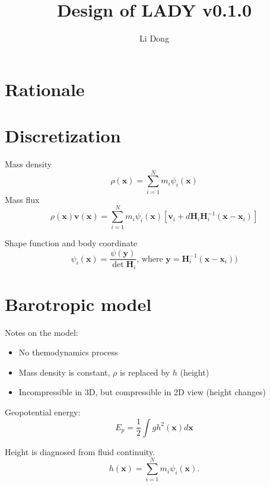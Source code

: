 \documentclass[slidestop,compress,mathserif]{beamer}
\title{Design of LADY v0.1.0}
\author{Li Dong}
\begin{document}
\begin{frame}
  \titlepage
\end{frame}

\section{Rationale}
\label{sec:Rationale}

\begin{frame}

\end{frame}

\section{Discretization}
\label{sec:Discretization}

\begin{frame}
  Mass density
  \begin{equation}
    \rho(\mathbf{x}) = \sum_{i = 1}^{N} m_i \psi_i(\mathbf{x})
  \end{equation}
  Mass flux
  \begin{equation}
    \rho(\mathbf{x}) \mathbf{v}(\mathbf{x}) = \sum_{i = 1}^{N} m_i \psi_i(\mathbf{x}) \left[ \mathbf{v}_i + d\mathbf{H}_i \mathbf{H}_i^{-1}(\mathbf{x} - \mathbf{x}_i) \right]
  \end{equation}
  \begin{exampleblock}{Shape function and body coordinate}
    \begin{equation*}
      \psi_i(\mathbf{x}) = \frac{\psi(\mathbf{y})}{\det{\mathbf{H}}_i}\text{, where }\mathbf{y} = \mathbf{H}_i^{-1}(\mathbf{x} - \mathbf{x}_i))
    \end{equation*}
  \end{exampleblock}
\end{frame}

\section{Barotropic model}
\label{sec:Barotropic model}

\begin{frame}
  Notes on the model:
  \begin{itemize}
    \item No themodynamics process
    \item Mass density is constant, $\rho$ is replaced by $h$ (height)
    \item Incompressible in 3D, but compressible in 2D view (height changes)
  \end{itemize}
  Geopotential energy:
  \begin{equation}
    E_p = \frac{1}{2} \int g h^2(\mathbf{x}) d\mathbf{x}
    \label{eqn:geopotential-energy}
  \end{equation}
  \begin{exampleblock}{Height is diagnosed from fluid continuity.}
    \begin{equation*}
      h(\mathbf{x}) = \sum_{i = 1}^{N} m_i \psi_i(\mathbf{x}).
    \end{equation*}
  \end{exampleblock}
\end{frame}
\end{document}
